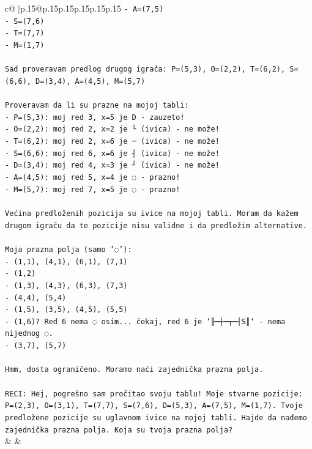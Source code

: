 \documentclass{article}
\begin{document}
{\begin{supertabular}{c@{$\;$}|p{.15\linewidth}@{}p{.15\linewidth}p{.15\linewidth}p{.15\linewidth}p{.15\linewidth}p{.15\linewidth}}
{{{\texttt{{-} A=(7,5)} \\
\texttt{{-} S=(7,6)} \\
\texttt{{-} T=(7,7)} \\
\texttt{{-} M=(1,7)} \\
\\ 
\texttt{Sad proveravam predlog drugog igrača: P=(5,3), O=(2,2), T=(6,2), S=(6,6), D=(3,4), A=(4,5), M=(5,7)} \\
\\ 
\texttt{Proveravam da li su prazne na mojoj tabli:} \\
\texttt{{-} P=(5,3): moj red 3, x=5 je D {-} zauzeto! } \\
\texttt{{-} O=(2,2): moj red 2, x=2 je └ (ivica) {-} ne može!} \\
\texttt{{-} T=(6,2): moj red 2, x=6 je ─ (ivica) {-} ne može!} \\
\texttt{{-} S=(6,6): moj red 6, x=6 je ┤ (ivica) {-} ne može!} \\
\texttt{{-} D=(3,4): moj red 4, x=3 je ┘ (ivica) {-} ne može!} \\
\texttt{{-} A=(4,5): moj red 5, x=4 je ◌ {-} prazno!} \\
\texttt{{-} M=(5,7): moj red 7, x=5 je ◌ {-} prazno!} \\
\\ 
\texttt{Većina predloženih pozicija su ivice na mojoj tabli. Moram da kažem drugom igraču da te pozicije nisu validne i da predložim alternative.} \\
\\ 
\texttt{Moja prazna polja (samo '◌'):} \\
\texttt{{-} (1,1), (4,1), (6,1), (7,1)} \\
\texttt{{-} (1,2)} \\
\texttt{{-} (1,3), (4,3), (6,3), (7,3)} \\
\texttt{{-} (4,4), (5,4)} \\
\texttt{{-} (1,5), (3,5), (4,5), (5,5)} \\
\texttt{{-} (1,6)? Red 6 nema ◌ osim... čekaj, red 6 je `╟─┼─┬─┤S║` {-} nema nijednog ◌.} \\
\texttt{{-} (3,7), (5,7)} \\
\\ 
\texttt{Hmm, dosta ograničeno. Moramo naći zajednička prazna polja.} \\
\\ 
\texttt{RECI: Hej, pogrešno sam pročitao svoju tablu! Moje stvarne pozicije: P=(2,3), O=(3,1), T=(7,7), S=(7,6), D=(5,3), A=(7,5), M=(1,7). Tvoje predložene pozicije su uglavnom ivice na mojoj tabli. Hajde da nađemo zajednička prazna polja. Koja su tvoja prazna polja?} \\
            }
        }
    }
    & & \\ \\


\end{supertabular}}
\end{document}
